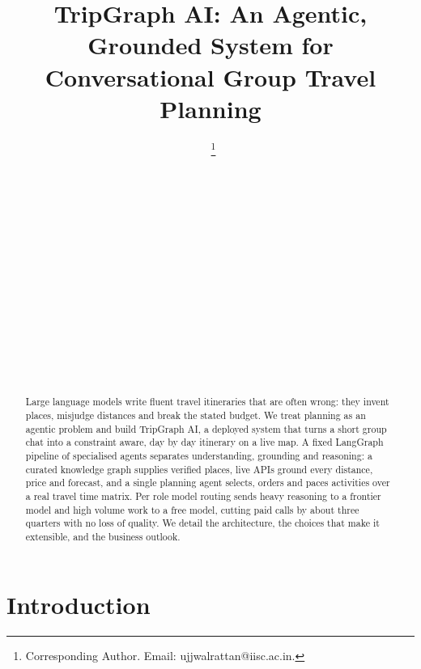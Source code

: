 \documentclass{ecai}
\begin{document}
\begin{frontmatter}


\title{TripGraph AI: An Agentic, Grounded System for \\
Conversational Group Travel Planning}

\author[A]{~\thanks{Corresponding Author. Email: ujjwalrattan@iisc.ac.in.}}
\author[A]{~}
\author[A]{~}
\author[A]{~}
\author[A]{~}
\author[A]{~}
\author[A]{~}
\author[A]{~}
\author[A]{~}

\address[A]{Indian Institute of Science, Bengaluru, India}

\begin{abstract}
Large language models write fluent travel itineraries that are often wrong:
they invent places, misjudge distances and break the stated budget. We treat
planning as an agentic problem and build TripGraph AI, a deployed system that
turns a short group chat into a constraint aware, day by day itinerary on a
live map. A fixed LangGraph pipeline of specialised agents separates
understanding, grounding and reasoning: a curated knowledge graph supplies
verified places, live APIs ground every distance, price and forecast, and a
single planning agent selects, orders and paces activities over a real travel
time matrix. Per role model routing sends heavy reasoning to a frontier model
and high volume work to a free model, cutting paid calls by about three
quarters with no loss of quality. We detail the architecture, the choices that
make it extensible, and the business outlook.
\end{abstract}

\end{frontmatter}

\section{Introduction}
\label{sec:intro}
\end{document}
